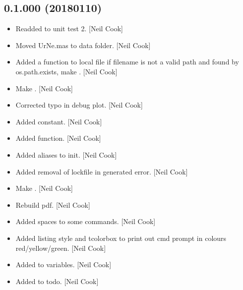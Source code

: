 \documentclass[a4paper,10pt,english]{report}
\begin{document}
\subsection{0.1.000 (2018\sphinxhyphen{}01\sphinxhyphen{}10)}
\label{\detokenize{misc/changelog:id522}}\begin{itemize}
\item {} 
Readded  to unit test 2. {[}Neil Cook{]}

\item {} 
Moved UrNe.mas to data folder. {[}Neil Cook{]}

\item {} 
Added a  function \sphinxhyphen{} to local file if filename is not a
valid path and found by os.path.exists, make  .
{[}Neil Cook{]}

\item {} 
Make  . {[}Neil Cook{]}

\item {} 
Corrected typo in debug plot. {[}Neil Cook{]}

\item {} 
Added  constant. {[}Neil Cook{]}

\item {} 
Added  function. {[}Neil Cook{]}

\item {} 
Added aliases to init. {[}Neil Cook{]}

\item {} 
Added removal of lockfile in generated error. {[}Neil Cook{]}

\item {} 
Make  . {[}Neil Cook{]}

\item {} 
Rebuild pdf. {[}Neil Cook{]}

\item {} 
Added spaces to some commands. {[}Neil Cook{]}

\item {} 
Added listing style and tcolorbox to print out cmd prompt in colours
red/yellow/green. {[}Neil Cook{]}

\item {} 
Added to variables. {[}Neil Cook{]}

\item {} 
Added to todo. {[}Neil Cook{]}


\end{itemize}
\end{document}
